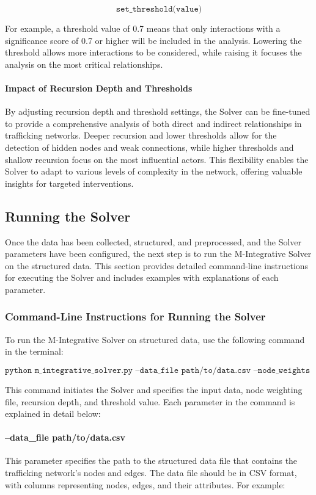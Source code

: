\documentclass[%
 preprint, linenumbers,
 amsmath,amssymb,
 aps, physrev,
]{revtex4-2}
\begin{document}
\[
\texttt{set\_threshold(value)}
\]

For example, a threshold value of 0.7 means that only interactions with a significance score of 0.7 or higher will be included in the analysis. Lowering the threshold allows more interactions to be considered, while raising it focuses the analysis on the most critical relationships.

\paragraph{Impact of Recursion Depth and Thresholds}
By adjusting recursion depth and threshold settings, the Solver can be fine-tuned to provide a comprehensive analysis of both direct and indirect relationships in trafficking networks. Deeper recursion and lower thresholds allow for the detection of hidden nodes and weak connections, while higher thresholds and shallow recursion focus on the most influential actors. This flexibility enables the Solver to adapt to various levels of complexity in the network, offering valuable insights for targeted interventions.

\subsection{Running the Solver}

Once the data has been collected, structured, and preprocessed, and the Solver parameters have been configured, the next step is to run the M-Integrative Solver on the structured data. This section provides detailed command-line instructions for executing the Solver and includes examples with explanations of each parameter.

\subsubsection{Command-Line Instructions for Running the Solver}

To run the M-Integrative Solver on structured data, use the following command in the terminal:

\[
\texttt{python m\_integrative\_solver.py --data\_file path/to/data.csv --node\_weights weights.csv --recursion\_depth 5 --threshold 0.7}
\]

This command initiates the Solver and specifies the input data, node weighting file, recursion depth, and threshold value. Each parameter in the command is explained in detail below:

\paragraph{--data\_file path/to/data.csv}
This parameter specifies the path to the structured data file that contains the trafficking network’s nodes and edges. The data file should be in CSV format, with columns representing nodes, edges, and their attributes. For example:
\end{document}
